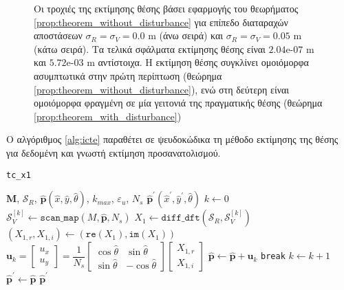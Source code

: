 \begin{figure}[h]\centering\vspace{1cm}
  
\caption{\small Οι τροχιές της εκτίμησης θέσης βάσει εφαρμογής του θεωρήματος
         \ref{prop:theorem_without_disturbance} για επίπεδο διαταραχών
         αποστάσεων $\sigma_R = \sigma_V = 0.0$ m (άνω σειρά) και
         $\sigma_R = \sigma_V = 0.05$ m (κάτω σειρά). Τα τελικά σφάλματα
         εκτίμησης θέσης είναι $2.04$e-$07$ m και $5.72$e-$03$ m αντίστοιχα.
         Η εκτίμηση θέσης συγκλίνει ομοιόμορφα ασυμπτωτικά στην πρώτη περίπτωση
         (θεώρημα \ref{prop:theorem_without_disturbance}), ενώ στη δεύτερη
         είναι ομοιόμορφα φραγμένη σε μία γειτονιά της πραγματικής θέσης
         (θεώρημα \ref{prop:theorem_with_disturbance})}
\label{fig:02_04_03:map_convergence}
\end{figure}

Ο αλγόριθμος \ref{alg:icte} παραθέτει σε ψευδοκώδικα τη μέθοδο εκτίμησης της
θέσης για δεδομένη και γνωστή εκτίμηση προσανατολισμού.

\begin{algorithm}[h]
  \caption{\texttt{tc\_x1}}
  \begin{spacing}{1.3}
    \begin{algorithmic}[1]
      \REQUIRE $\bm{M}$, $\mathcal{S}_R$, $\hat{\bm{p}}(\hat{x}, \hat{y}, \hat{\theta})$, $k_{max}$, $\varepsilon_u$, $N_s$
      \ENSURE $\hat{\bm{p}}^\prime(\hat{x}^{\prime}, \hat{y}^{\prime}, \hat{\theta})$
      \STATE $k \leftarrow 0$
      \STATE $\mathcal{S}_V^{[k]} \leftarrow \texttt{scan\_map}(M, \hat{\bm{p}}, N_s)$
      \STATE $X_1 \leftarrow \texttt{diff\_dft}(\mathcal{S}_R, \mathcal{S}_V^{[k]})$
      \STATE $(X_{1,r}, X_{1,i}) \leftarrow (\texttt{re}(X_1), \texttt{im}(X_1))$
      \STATE $\bm{u}_k = \begin{bmatrix}
              u_x \\ u_y
             \end{bmatrix}
             =
             \dfrac{1}{N_s}
             \begin{bmatrix}
               \cos\hat{\theta} & \sin\hat{\theta} \\
               \sin\hat{\theta} & -\cos\hat{\theta}
             \end{bmatrix}
             \begin{bmatrix}
               X_{1,r} \\ X_{1,i}
             \end{bmatrix}
             $
      \STATE $\hat{\bm{p}}\leftarrow \hat{\bm{p}}+ \bm{u}_k$
        \STATE \texttt{break}
      \ENDIF
      \STATE $k \leftarrow k + 1$
      \ENDWHILE
      \STATE $\hat{\bm{p}}^\prime \leftarrow \hat{\bm{p}}$
      \RETURN $\hat{\bm{p}}^\prime$
    \end{algorithmic}
  \end{spacing}
  \label{alg:icte}
\end{algorithm}

